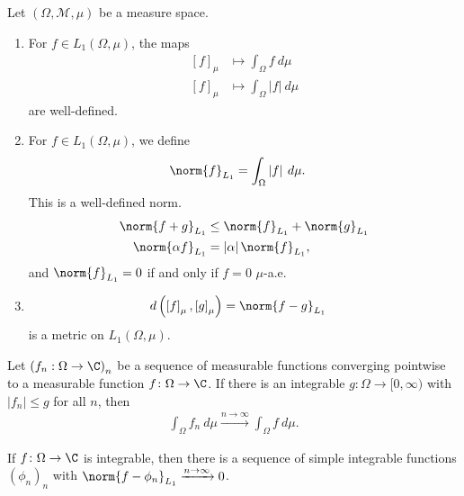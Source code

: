 \begin{fact}
  Let $\left(\Omega,\mathcal{M},\mu\right)$ be a measure space.
  \begin{enumerate}[(1)]
    \item For $f\in L_{1}\left(\Omega,\mu\right)$, the maps
      \begin{align*}
        \left[f\right]_{\mu} &\longmapsto \int_{\Omega}^{} f\:d\mu\\
        \left[f\right]_{\mu} &\longmapsto \int_{\Omega}^{} \left\vert f \right\vert\:d\mu
      \end{align*}
      are well-defined.
    \item For $f\in L_{1}\left(\Omega,\mu\right)$, we define
      \begin{align*}
        \norm{f}_{L_1} &= \int_{\Omega}^{} \left\vert f \right\vert\:d\mu.
      \end{align*}
      This is a well-defined norm.
      \begin{align*}
        \norm{f+g}_{L_1} &\leq \norm{f}_{L_1} + \norm{g}_{L_1}\\
        \norm{\alpha f}_{L_1} &= \left\vert \alpha \right\vert\norm{f}_{L_1},
      \end{align*}
      and $\norm{f}_{L_1} = 0$ if and only if $f = 0$ $\mu$-a.e.
    \item 
      \begin{align*}
        d\left(\left[f\right]_{\mu},\left[g\right]_{\mu}\right) &= \norm{f-g}_{L_1}
      \end{align*}
      is a metric on $L_{1}\left(\Omega,\mu\right)$.
  \end{enumerate}
\end{fact}
\begin{theorem}
  Let $\left(f_n:\Omega\rightarrow \C\right)_{n}$ be a sequence of measurable functions converging pointwise to a measurable function $f\colon \Omega\rightarrow \C$. If there is an integrable $g\colon \Omega \rightarrow [0,\infty)$ with $\left\vert f_n \right\vert\leq g$ for all $n$, then
  \begin{align*}
    \int_{\Omega}^{} f_n\:d\mu \xrightarrow{n\rightarrow\infty}\int_{\Omega}^{} f\:d\mu.
  \end{align*}
\end{theorem}
\begin{corollary}
  If $f\colon \Omega\rightarrow \C$ is integrable, then there is a sequence of simple integrable functions $\left(\phi_n\right)_n$ with $\norm{f - \phi_{n}}_{L_1}\xrightarrow{n\rightarrow\infty}0$.
\end{corollary}
